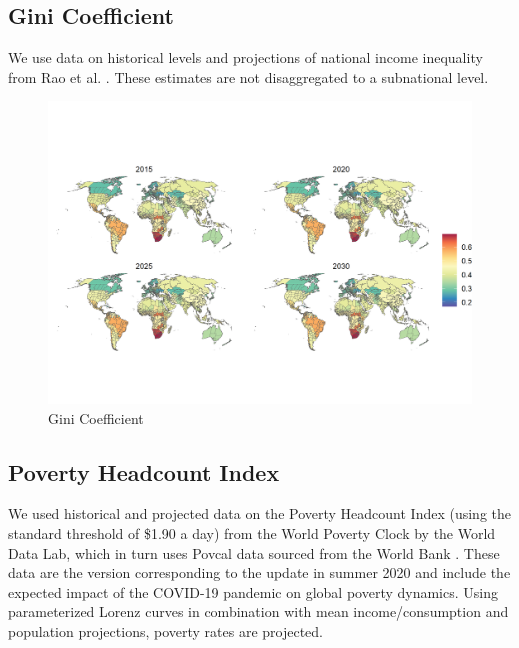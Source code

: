 \documentclass{article}
\begin{document}
\pagebreak
\subsection{Gini Coefficient}
We use data on historical levels and projections of national income inequality from Rao et al. \citep{Rao2019a}.  These estimates are not disaggregated to a subnational level.

\begin{figure}[H]
  \centering
  \includegraphics[width=\linewidth]{img/covars/gini.png}
  \caption{Gini Coefficient}
\end{figure}

\pagebreak
\subsection{Poverty Headcount Index}
We used historical and projected data on the Poverty Headcount Index (using the standard threshold of \$1.90 a day) from the World Poverty Clock by the World Data Lab, which in turn uses Povcal data sourced from the World Bank \citep{Cuaresma2018}. These data are the version corresponding to the update in summer 2020 and include the expected impact of the COVID-19 pandemic on global poverty dynamics. Using parameterized Lorenz curves in combination with mean income/consumption and population projections, poverty rates are projected. 
\end{document}
